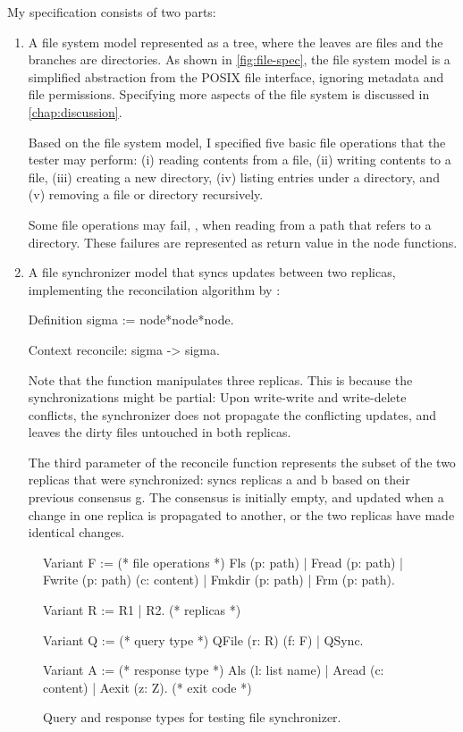 My specification consists of two parts:
\begin{enumerate}
  \item A file system model represented as a tree, where the leaves are files
    and the branches are directories.  As shown in \autoref{fig:file-spec}, the
    file system model is a simplified abstraction from the POSIX file interface,
    ignoring metadata and file permissions.  Specifying more aspects of the file
    system is discussed in \autoref{chap:discussion}.

    Based on the file system model, I specified five basic file operations that
    the tester may perform: (i) reading contents from a file, (ii) writing
    contents to a file, (iii) creating a new directory, (iv) listing entries
    under a directory, and (v) removing a file or directory recursively.

    Some file operations may fail, \eg, when reading from a path that
    refers to a directory.  These failures are represented as return value
     in the node functions.
  \item A file synchronizer model that syncs updates between two replicas,
    implementing the reconcilation algorithm by \citet{what-sync}:
\begin{coq}
  Definition sigma := node*node*node.
      
  Context reconcile: sigma -> sigma.
\end{coq}
Note that the  function manipulates three replicas.  This is
because the synchronizations might be partial: Upon write-write and write-delete
conflicts, the synchronizer does not propagate the conflicting updates, and
leaves the dirty files untouched in both replicas.

The third parameter of the reconcile function represents the subset of the two
replicas that were synchronized:  syncs replicas \ilc a
and \ilc b based on their previous consensus \ilc g.  The consensus is initially
empty, and updated when a change in one replica is propagated to another, or the
two replicas have made identical changes.
\end{enumerate}

\begin{figure}
\begin{coq}
  Variant F :=        (* file operations *)
  Fls    (p: path)
| Fread  (p: path)
| Fwrite (p: path) (c: content)
| Fmkdir (p: path)
| Frm    (p: path).

Variant R := R1 | R2. (* replicas      *)

Variant Q :=          (* query type    *)
  QFile (r: R) (f: F)
| QSync.

Variant A :=          (* response type *)
  Als   (l: list name)
| Aread (c: content)
| Aexit (z: Z).       (* exit code     *)
\end{coq}
\caption{Query and response types for testing file synchronizer.}
\label{fig:file-type}
\end{figure}

